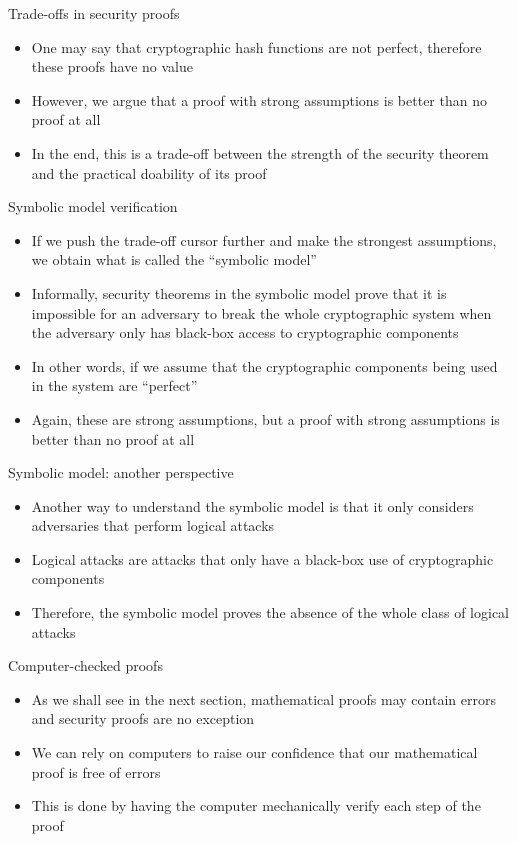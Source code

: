 \documentclass[aspectratio=169, lualatex, handout]{beamer}
\begin{document}
\begin{frame}{Trade-offs in security proofs}
	\begin{itemize}
		\item One may say that cryptographic hash functions are not perfect, therefore these proofs have no value
		\item However, we argue that a proof with strong assumptions is better than no proof at all
		\item In the end, this is a trade-off between the strength of the security theorem and the practical doability of its proof
	\end{itemize}
\end{frame}

\begin{frame}{Symbolic model verification}
	\begin{itemize}
		\item If we push the trade-off cursor further and make the strongest assumptions, we obtain what is called the ``symbolic model''
		\item Informally, security theorems in the symbolic model prove that it is impossible for an adversary to break the whole cryptographic system when the adversary only has black-box access to cryptographic components
		\item In other words, if we assume that the cryptographic components being used in the system are ``perfect''
		\item Again, these are strong assumptions, but a proof with strong assumptions is better than no proof at all
	\end{itemize}
\end{frame}

\begin{frame}{Symbolic model: another perspective}
	\begin{itemize}
		\item Another way to understand the symbolic model is that it only considers adversaries that perform logical attacks
		\item Logical attacks are attacks that only have a black-box use of cryptographic components
		\item Therefore, the symbolic model proves the absence of the whole class of logical attacks
	\end{itemize}
\end{frame}

\begin{frame}{Computer-checked proofs}
	\begin{itemize}
		\item As we shall see in the next section, mathematical proofs may contain errors and security proofs are no exception
		\item We can rely on computers to raise our confidence that our mathematical proof is free of errors
		\item This is done by having the computer mechanically verify each step of the proof
	\end{itemize}
\end{frame}
\end{document}
